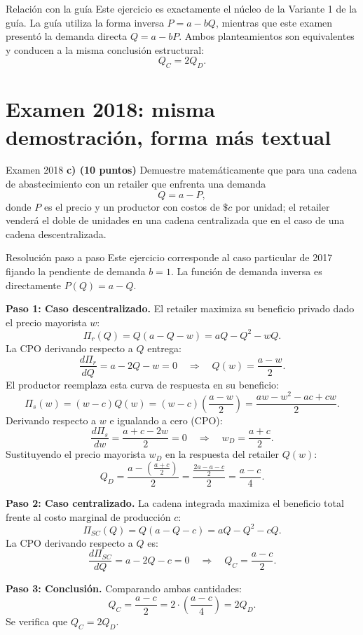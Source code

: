 \documentclass[11pt,a4paper]{article}
\begin{document}
\begin{analisis}{Relación con la guía}
Este ejercicio es exactamente el núcleo de la Variante 1 de la guía. La guía utiliza la forma inversa \(P = a - bQ\), mientras que este examen presentó la demanda directa \(Q = a - bP\). Ambos planteamientos son equivalentes y conducen a la misma conclusión estructural:
\[
Q_C = 2Q_D.
\]
\end{analisis}

\section{Examen 2018: misma demostración, forma más textual}

\begin{enunciado}{Examen 2018}
\textbf{c) (10 puntos)} Demuestre matemáticamente que para una cadena de abastecimiento con un retailer que enfrenta una demanda
\[
Q=a-P,
\]
donde \(P\) es el precio y un productor con costos de \(\$c\) por unidad; el retailer venderá el doble de unidades en una cadena centralizada que en el caso de una cadena descentralizada.
\end{enunciado}

\begin{pauta}{Resolución paso a paso}
Este ejercicio corresponde al caso particular de 2017 fijando la pendiente de demanda \(b = 1\). La función de demanda inversa es directamente \(P(Q) = a - Q\).

\textbf{Paso 1: Caso descentralizado.}
El retailer maximiza su beneficio privado dado el precio mayorista \(w\):
\[
\Pi_r(Q) = Q(a - Q - w) = aQ - Q^2 - wQ.
\]
La CPO derivando respecto a \(Q\) entrega:
\[
\frac{d\Pi_r}{dQ} = a - 2Q - w = 0 
\quad\Rightarrow\quad Q(w) = \frac{a - w}{2}.
\]
El productor reemplaza esta curva de respuesta en su beneficio:
\[
\Pi_s(w) = (w - c)Q(w) = (w - c)\left(\frac{a - w}{2}\right) = \frac{aw - w^2 - ac + cw}{2}.
\]
Derivando respecto a \(w\) e igualando a cero (CPO):
\[
\frac{d\Pi_s}{dw} = \frac{a + c - 2w}{2} = 0 
\quad\Rightarrow\quad w_D = \frac{a + c}{2}.
\]
Sustituyendo el precio mayorista \(w_D\) en la respuesta del retailer \(Q(w)\):
\[
Q_D = \frac{a - \left(\frac{a + c}{2}\right)}{2} = \frac{\frac{2a - a - c}{2}}{2} = \frac{a - c}{4}.
\]

\textbf{Paso 2: Caso centralizado.}
La cadena integrada maximiza el beneficio total frente al costo marginal de producción \(c\):
\[
\Pi_{SC}(Q) = Q(a - Q - c) = aQ - Q^2 - cQ.
\]
La CPO derivando respecto a \(Q\) es:
\[
\frac{d\Pi_{SC}}{dQ} = a - 2Q - c = 0 
\quad\Rightarrow\quad Q_C = \frac{a - c}{2}.
\]

\textbf{Paso 3: Conclusión.}
Comparando ambas cantidades:
\[
Q_C = \frac{a - c}{2} = 2 \cdot \left( \frac{a - c}{4} \right) = 2 Q_D.
\]
Se verifica que \(Q_C = 2Q_D\).
\end{pauta}
\end{document}
